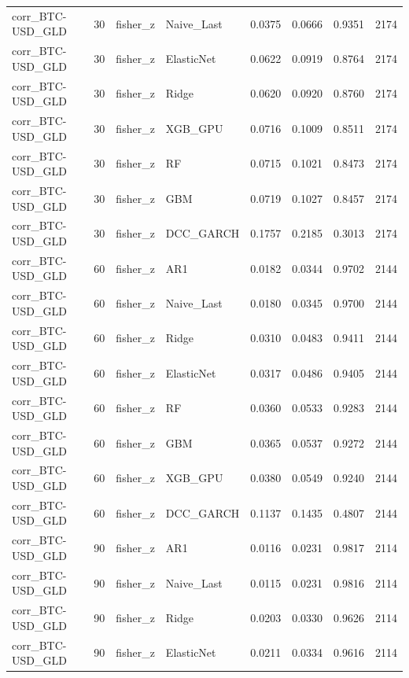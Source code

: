 \begin{table}[H]
\begin{tabular}{llllrrrr}
corr_BTC-USD_GLD & 30 & fisher_z & Naive_Last & 0.0375 & 0.0666 & 0.9351 & 2174 \\
corr_BTC-USD_GLD & 30 & fisher_z & ElasticNet & 0.0622 & 0.0919 & 0.8764 & 2174 \\
corr_BTC-USD_GLD & 30 & fisher_z & Ridge & 0.0620 & 0.0920 & 0.8760 & 2174 \\
corr_BTC-USD_GLD & 30 & fisher_z & XGB_GPU & 0.0716 & 0.1009 & 0.8511 & 2174 \\
corr_BTC-USD_GLD & 30 & fisher_z & RF & 0.0715 & 0.1021 & 0.8473 & 2174 \\
corr_BTC-USD_GLD & 30 & fisher_z & GBM & 0.0719 & 0.1027 & 0.8457 & 2174 \\
corr_BTC-USD_GLD & 30 & fisher_z & DCC_GARCH & 0.1757 & 0.2185 & 0.3013 & 2174 \\
corr_BTC-USD_GLD & 60 & fisher_z & AR1 & 0.0182 & 0.0344 & 0.9702 & 2144 \\
corr_BTC-USD_GLD & 60 & fisher_z & Naive_Last & 0.0180 & 0.0345 & 0.9700 & 2144 \\
corr_BTC-USD_GLD & 60 & fisher_z & Ridge & 0.0310 & 0.0483 & 0.9411 & 2144 \\
corr_BTC-USD_GLD & 60 & fisher_z & ElasticNet & 0.0317 & 0.0486 & 0.9405 & 2144 \\
corr_BTC-USD_GLD & 60 & fisher_z & RF & 0.0360 & 0.0533 & 0.9283 & 2144 \\
corr_BTC-USD_GLD & 60 & fisher_z & GBM & 0.0365 & 0.0537 & 0.9272 & 2144 \\
corr_BTC-USD_GLD & 60 & fisher_z & XGB_GPU & 0.0380 & 0.0549 & 0.9240 & 2144 \\
corr_BTC-USD_GLD & 60 & fisher_z & DCC_GARCH & 0.1137 & 0.1435 & 0.4807 & 2144 \\
corr_BTC-USD_GLD & 90 & fisher_z & AR1 & 0.0116 & 0.0231 & 0.9817 & 2114 \\
corr_BTC-USD_GLD & 90 & fisher_z & Naive_Last & 0.0115 & 0.0231 & 0.9816 & 2114 \\
corr_BTC-USD_GLD & 90 & fisher_z & Ridge & 0.0203 & 0.0330 & 0.9626 & 2114 \\
corr_BTC-USD_GLD & 90 & fisher_z & ElasticNet & 0.0211 & 0.0334 & 0.9616 & 2114 \\
\bottomrule
\end{tabular}
\end{table}